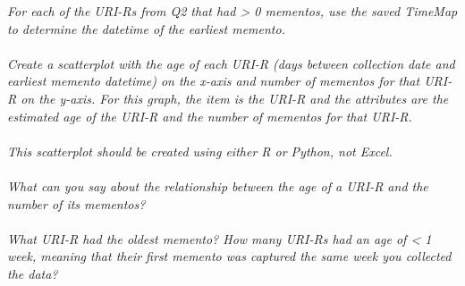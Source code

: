 \documentclass[12pt]{article}
\begin{document}
\emph{For each of the URI-Rs from Q2 that had > 0 mementos, use the saved TimeMap to determine the datetime of the earliest memento.
\\ \\
Create a scatterplot with the age of each URI-R (days between collection date and earliest memento datetime) on the x-axis and number of mementos for that URI-R on the y-axis. For this graph, the item is the URI-R and the attributes are the estimated age of the URI-R and the number of mementos for that URI-R.
\\ \\
This scatterplot should be created using either R or Python, not Excel.
\\ \\
What can you say about the relationship between the age of a URI-R and the number of its mementos?
\\ \\
What URI-R had the oldest memento? How many URI-Rs had an age of < 1 week, meaning that their first memento was captured the same week you collected the data?}
\newline
\end{document}
